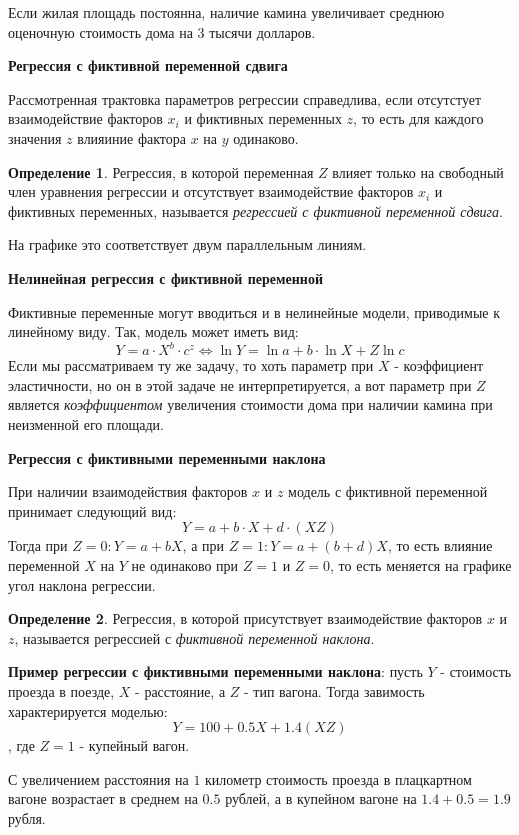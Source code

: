 \documentclass[aps,%
12pt,%
final,%
oneside,
onecolumn,%
musixtex, %
superscriptaddress,%
centertags]{article} %
\theoremstyle{plain}
\theoremstyle{definition}
\newtheorem{definition}{Определение}[subsection]
\theoremstyle{remark}
\begin{document}
Если жилая площадь постоянна, наличие камина увеличивает среднюю оценочную стоимость дома на $3$ тысячи долларов.

\textbf{Регрессия с фиктивной переменной сдвига}

Рассмотренная трактовка параметров регрессии справедлива, если отсутстует взаимодействие факторов $x_i$ и фиктивных переменных $z$, то есть для каждого значения $z$ влияиние фактора $x$ на $y$ одинаково.

\begin{definition}
	Регрессия, в которой переменная $Z$ влияет только на свободный член уравнения регрессии и отсутствует взаимодействие факторов $x_i$ и фиктивных переменных, называется \textit{регрессией с фиктивной переменной сдвига}.

	На графике это соответствует двум параллельным линиям.
\end{definition}

\textbf{Нелинейная регрессия с фиктивной переменной}

Фиктивные переменные могут вводиться и в нелинейные модели, приводимые к линейному виду. Так, модель может иметь вид:
$$Y = a \cdot X^b \cdot c^z \Leftrightarrow \ln Y = \ln a + b\cdot \ln X + Z \ln c$$
Если мы рассматриваем ту же задачу, то хоть параметр при $X$ - коэффициент эластичности, но он в этой задаче не интерпретируется, а вот параметр при $Z$ является \textit{коэффициентом} увеличения стоимости дома при наличии камина при неизменной его площади.

\textbf{Регрессия с фиктивными переменными наклона}

При наличии взаимодействия факторов $x$ и $z$ модель с фиктивной переменной принимает следующий вид:
$$Y = a + b \cdot X + d\cdot (XZ)$$
Тогда при $Z=0: Y = a+bX$, а при $Z=1: Y = a +(b+d)X$, то есть влияние переменной $X$ на $Y$ не одинаково при $Z=1$ и $Z=0$, то есть меняется на графике угол наклона регрессии. 

\begin{definition}
	Регрессия, в которой присутствует взаимодействие факторов $x$ и $z$, называется регрессией с \textit{фиктивной переменной наклона}.
\end{definition}

\textbf{Пример регрессии с фиктивными переменными наклона}: пусть $Y$ - стоимость проезда в поезде, $X$ - расстояние, а $Z$ - тип вагона. Тогда завимость характерируется моделью:
$$Y = 100 + 0.5X + 1.4(XZ)$$, где $Z=1$ - купейный вагон.

С увеличением расстояния на $1$ километр стоимость проезда в плацкартном вагоне возрастает в среднем на $0.5$ рублей, а в купейном вагоне на $1.4 + 0.5 = 1.9$ рубля. 
\end{document}

